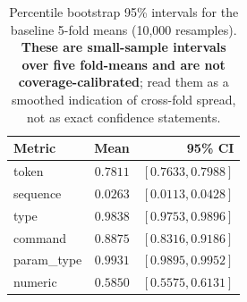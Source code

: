 \begin{table}[H]
\centering
\caption{Percentile bootstrap 95\% intervals for the baseline 5-fold means (10{,}000 resamples). \textbf{These are small-sample intervals over five fold-means and are not coverage-calibrated}; read them as a smoothed indication of cross-fold spread, not as exact confidence statements.}
\label{tab:bootstrap_ci}
\begin{tabular}{l r r}
\toprule
Metric & Mean & 95\% CI \\
\midrule
token & $0.7811$ & $[0.7633, 0.7988]$ \\
sequence & $0.0263$ & $[0.0113, 0.0428]$ \\
type & $0.9838$ & $[0.9753, 0.9896]$ \\
command & $0.8875$ & $[0.8316, 0.9186]$ \\
param\_type & $0.9931$ & $[0.9895, 0.9952]$ \\
numeric & $0.5850$ & $[0.5575, 0.6131]$ \\
\bottomrule
\end{tabular}
\end{table}
